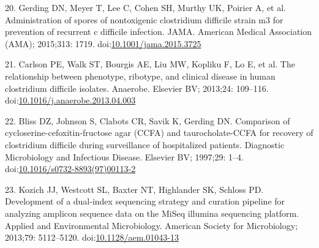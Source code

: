 \documentclass[11pt,]{article}
\begin{document}
20. Gerding DN, Meyer T, Lee C, Cohen SH, Murthy UK, Poirier A, et al.
Administration of spores of nontoxigenic clostridium difficile strain m3
for prevention of recurrent c difficile infection. JAMA. American
Medical Association (AMA); 2015;313: 1719.
doi:\href{http://dx.doi.org/10.1001/jama.2015.3725}{10.1001/jama.2015.3725}

21. Carlson PE, Walk ST, Bourgis AE, Liu MW, Kopliku F, Lo E, et al. The
relationship between phenotype, ribotype, and clinical disease in human
clostridium difficile isolates. Anaerobe. Elsevier BV; 2013;24:
109--116.
doi:\href{http://dx.doi.org/10.1016/j.anaerobe.2013.04.003}{10.1016/j.anaerobe.2013.04.003}

22. Bliss DZ, Johnson S, Clabots CR, Savik K, Gerding DN. Comparison of
cycloserine-cefoxitin-fructose agar (CCFA) and taurocholate-CCFA for
recovery of clostridium difficile during surveillance of hospitalized
patients. Diagnostic Microbiology and Infectious Disease. Elsevier BV;
1997;29: 1--4.
doi:\href{http://dx.doi.org/10.1016/s0732-8893(97)00113-2}{10.1016/s0732-8893(97)00113-2}

23. Kozich JJ, Westcott SL, Baxter NT, Highlander SK, Schloss PD.
Development of a dual-index sequencing strategy and curation pipeline
for analyzing amplicon sequence data on the MiSeq illumina sequencing
platform. Applied and Environmental Microbiology. American Society for
Microbiology; 2013;79: 5112--5120.
doi:\href{http://dx.doi.org/10.1128/aem.01043-13}{10.1128/aem.01043-13}
\end{document}
